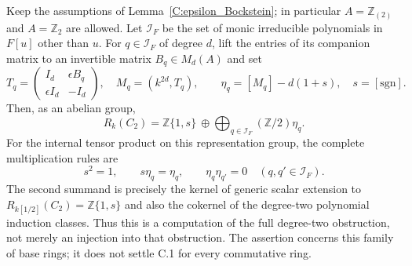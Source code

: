 \begin{theorem}
\label{C:dualnumber_C2_ring}
Keep the assumptions of Lemma~\ref{C:epsilon_Bockstein}; in
particular $A=\mathbb Z_{(2)}$ and $A=\mathbb Z_2$ are allowed.
Let $\mathcal I_F$ be the set of monic irreducible polynomials in
$F[u]$ other than $u$. For $q\in\mathcal I_F$ of degree $d$, lift
the entries of its companion matrix to an invertible matrix
$B_q\in M_d(A)$ and set
\[
 T_q=\begin{pmatrix}I_d&\epsilon B_q\\
                     \epsilon I_d&-I_d\end{pmatrix},
 \quad M_q=(k^{2d},T_q),\qquad
 \eta_q=[M_q]-d(1+s),\quad s=[\mathrm{sgn}].             \tag{C.1.11}
\]
Then, as an abelian group,
\[
 R_k(C_2)=\mathbb Z\{1,s\}\ \oplus
             \bigoplus_{q\in\mathcal I_F}(\mathbb Z/2)\eta_q.
                                                               \tag{C.1.12}
\]
For the internal tensor product on this representation group,
the complete multiplication rules are
\[
 s^2=1,\qquad s\eta_q=\eta_q,\qquad
 \eta_q\eta_{q'}=0\quad(q,q'\in\mathcal I_F).           \tag{C.1.13}
\]
The second summand is precisely the kernel of generic scalar
extension to $R_{k[1/2]}(C_2)=\mathbb Z\{1,s\}$ and also
the cokernel of the degree-two polynomial induction classes.
Thus this is a computation of the full degree-two obstruction,
not merely an injection into that obstruction. The assertion
concerns this family of base rings; it does not settle C.1 for
every commutative ring.
\end{theorem}
